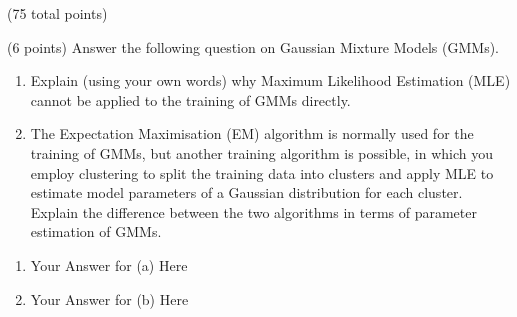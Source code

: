 \documentclass[12pt]{article}
\begin{document}
\begin{question}{(75 total points) \qTwoTitle}
\begin{subquestion}{(6 points)
    Answer the following question on Gaussian Mixture Models (GMMs).
  } \label{q2:gmm-1}
  \begin{enumerate}\NARROWITEM
  \item Explain (using your own words) why Maximum Likelihood Estimation (MLE) cannot be applied to the training of GMMs directly.
  \item The Expectation Maximisation (EM) algorithm is normally used for the training of GMMs, but another training algorithm is possible, in which you employ \kmeans clustering to split the training data into clusters and apply MLE to estimate model parameters of a Gaussian distribution for each cluster. Explain the difference between the two algorithms in terms of parameter estimation of GMMs.
    \end{enumerate}
   

  \begin{answerbox}{0.6\textheight}
    \begin{enumerate}
    \item Your Answer for (a) Here
    \item Your Answer for (b) Here
    \end{enumerate}
  \end{answerbox}
  


\end{subquestion}


\end{question}
\end{document}
